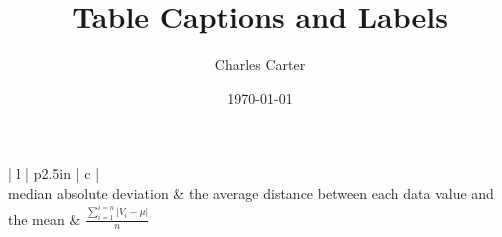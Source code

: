 \documentclass{article}
\title{Table Captions and Labels}
\author{Charles Carter}
\date{\today{}}
\begin{document}
 
    \maketitle{}
    \listoftables{}
        \begin{table}
            \begin{tabular}{| l | p{2.5in} |  c |}
                \hline
                 \\
                \hline
                median absolute deviation & the average distance between each data value and the mean & $\frac{\sum_{i=1}^{i=n}|V_i - \mu|}{n}$  \\ 
                \hline
            \end{tabular}
        \caption{Multicolumn Example}
        \label{multicol}
        \end{table}
\end{document}
